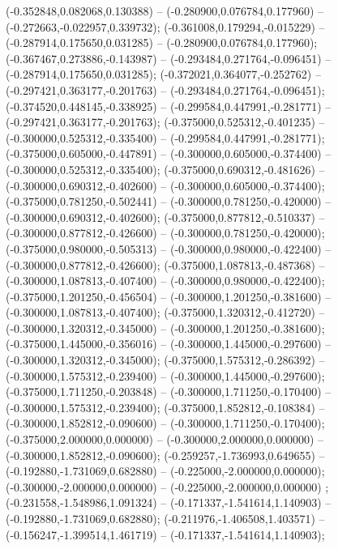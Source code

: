 (-0.352848,0.082068,0.130388) -- (-0.280900,0.076784,0.177960) -- (-0.272663,-0.022957,0.339732);
 (-0.361008,0.179294,-0.015229) -- (-0.287914,0.175650,0.031285) -- (-0.280900,0.076784,0.177960);
 (-0.367467,0.273886,-0.143987) -- (-0.293484,0.271764,-0.096451) -- (-0.287914,0.175650,0.031285);
 (-0.372021,0.364077,-0.252762) -- (-0.297421,0.363177,-0.201763) -- (-0.293484,0.271764,-0.096451);
 (-0.374520,0.448145,-0.338925) -- (-0.299584,0.447991,-0.281771) -- (-0.297421,0.363177,-0.201763);
 (-0.375000,0.525312,-0.401235) -- (-0.300000,0.525312,-0.335400) -- (-0.299584,0.447991,-0.281771);
 (-0.375000,0.605000,-0.447891) -- (-0.300000,0.605000,-0.374400) -- (-0.300000,0.525312,-0.335400);
 (-0.375000,0.690312,-0.481626) -- (-0.300000,0.690312,-0.402600) -- (-0.300000,0.605000,-0.374400);
 (-0.375000,0.781250,-0.502441) -- (-0.300000,0.781250,-0.420000) -- (-0.300000,0.690312,-0.402600);
 (-0.375000,0.877812,-0.510337) -- (-0.300000,0.877812,-0.426600) -- (-0.300000,0.781250,-0.420000);
 (-0.375000,0.980000,-0.505313) -- (-0.300000,0.980000,-0.422400) -- (-0.300000,0.877812,-0.426600);
 (-0.375000,1.087813,-0.487368) -- (-0.300000,1.087813,-0.407400) -- (-0.300000,0.980000,-0.422400);
 (-0.375000,1.201250,-0.456504) -- (-0.300000,1.201250,-0.381600) -- (-0.300000,1.087813,-0.407400);
 (-0.375000,1.320312,-0.412720) -- (-0.300000,1.320312,-0.345000) -- (-0.300000,1.201250,-0.381600);
 (-0.375000,1.445000,-0.356016) -- (-0.300000,1.445000,-0.297600) -- (-0.300000,1.320312,-0.345000);
 (-0.375000,1.575312,-0.286392) -- (-0.300000,1.575312,-0.239400) -- (-0.300000,1.445000,-0.297600);
 (-0.375000,1.711250,-0.203848) -- (-0.300000,1.711250,-0.170400) -- (-0.300000,1.575312,-0.239400);
 (-0.375000,1.852812,-0.108384) -- (-0.300000,1.852812,-0.090600) -- (-0.300000,1.711250,-0.170400);
 (-0.375000,2.000000,0.000000) -- (-0.300000,2.000000,0.000000) -- (-0.300000,1.852812,-0.090600);
 (-0.259257,-1.736993,0.649655) -- (-0.192880,-1.731069,0.682880) -- (-0.225000,-2.000000,0.000000);
 (-0.300000,-2.000000,0.000000) -- (-0.225000,-2.000000,0.000000) ;
 (-0.231558,-1.548986,1.091324) -- (-0.171337,-1.541614,1.140903) -- (-0.192880,-1.731069,0.682880);
 (-0.211976,-1.406508,1.403571) -- (-0.156247,-1.399514,1.461719) -- (-0.171337,-1.541614,1.140903);
